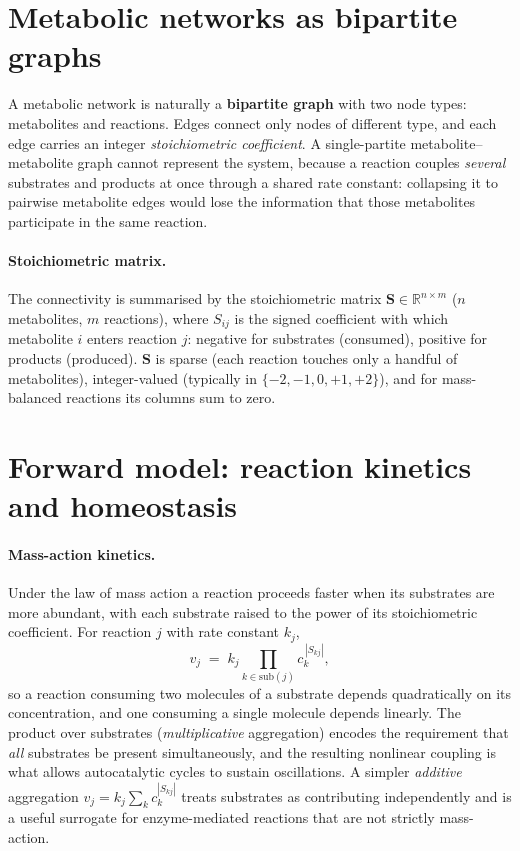 \documentclass[11pt]{article}
\def\R{\mathbb{R}}
\begin{document}
\section{Metabolic networks as bipartite graphs}
\label{sec:graph}

A metabolic network is naturally a \textbf{bipartite graph} with two node
types: metabolites and reactions. Edges connect only nodes of different
type, and each edge carries an integer \emph{stoichiometric coefficient}.
A single-partite metabolite--metabolite graph cannot represent the system,
because a reaction couples \emph{several} substrates and products at once
through a shared rate constant: collapsing it to pairwise metabolite edges
would lose the information that those metabolites participate in the same
reaction.

\paragraph{Stoichiometric matrix.}
The connectivity is summarised by the stoichiometric matrix
$\mathbf{S} \in \R^{n \times m}$ ($n$ metabolites, $m$ reactions), where
$S_{ij}$ is the signed coefficient with which metabolite $i$ enters
reaction $j$: negative for substrates (consumed), positive for products
(produced). $\mathbf{S}$ is sparse (each reaction touches only a handful of
metabolites), integer-valued (typically in $\{-2,-1,0,+1,+2\}$), and for
mass-balanced reactions its columns sum to zero.

\section{Forward model: reaction kinetics and homeostasis}
\label{sec:forward}

\paragraph{Mass-action kinetics.}
Under the law of mass action a reaction proceeds faster when its substrates
are more abundant, with each substrate raised to the power of its
stoichiometric coefficient. For reaction $j$ with rate constant $k_j$,
\begin{equation}
v_j \;=\; k_j \prod_{k \in \mathrm{sub}(j)} c_k^{\,|S_{kj}|},
\label{eq:massaction}
\end{equation}
so a reaction consuming two molecules of a substrate depends quadratically
on its concentration, and one consuming a single molecule depends linearly.
The product over substrates (\emph{multiplicative} aggregation) encodes the
requirement that \emph{all} substrates be present simultaneously, and the
resulting nonlinear coupling is what allows autocatalytic cycles to sustain
oscillations. A simpler \emph{additive} aggregation
$v_j = k_j \sum_{k} c_k^{|S_{kj}|}$ treats substrates as contributing
independently and is a useful surrogate for enzyme-mediated reactions that
are not strictly mass-action.
\end{document}

